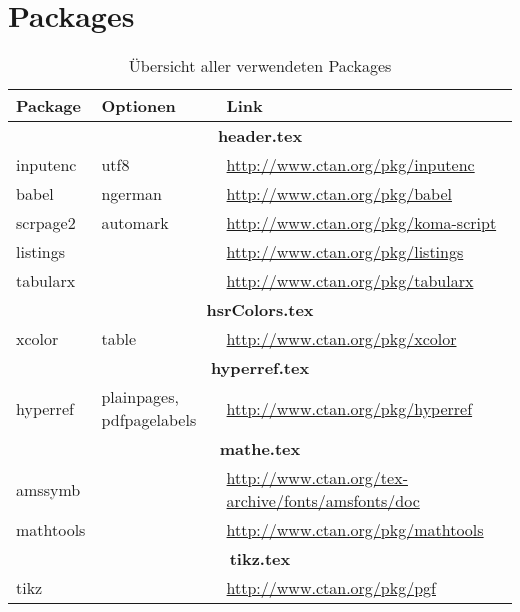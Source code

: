 \section{Packages}
\begin{table}[h]
\begin{tabularx}{\linewidth}{|l|l|X|}
	\hline
	\textbf{Package} & \textbf{Optionen} & \textbf{Link}
	\\ \hline
	\multicolumn{3}{|c|}{\textbf{header.tex}}
	\\ \hline
	inputenc & utf8 & \url{http://www.ctan.org/pkg/inputenc}
	\\ \hline
	babel & ngerman & \url{http://www.ctan.org/pkg/babel}
	\\ \hline
	scrpage2 & automark & \url{http://www.ctan.org/pkg/koma-script}
	\\ \hline
	listings & & \url{http://www.ctan.org/pkg/listings}
	\\ \hline
	tabularx & & \url{http://www.ctan.org/pkg/tabularx}
	\\ \hline
	\multicolumn{3}{|c|}{\textbf{hsrColors.tex}}
	\\ \hline
	xcolor & table & \url{http://www.ctan.org/pkg/xcolor}
	\\ \hline
	\multicolumn{3}{|c|}{\textbf{hyperref.tex}}
	\\ \hline
	hyperref & plainpages, pdfpagelabels & \url{http://www.ctan.org/pkg/hyperref}
	\\ \hline
	\multicolumn{3}{|c|}{\textbf{mathe.tex}}
	\\ \hline
	amssymb & & \url{http://www.ctan.org/tex-archive/fonts/amsfonts/doc}
	\\ \hline
	mathtools & & \url{http://www.ctan.org/pkg/mathtools}
	\\ \hline
	\multicolumn{3}{|c|}{\textbf{tikz.tex}}
	\\ \hline
	tikz & & \url{http://www.ctan.org/pkg/pgf}
	\\ \hline
\end{tabularx}
\caption{Übersicht aller verwendeten Packages}
\label{tab:packages}
\end{table}